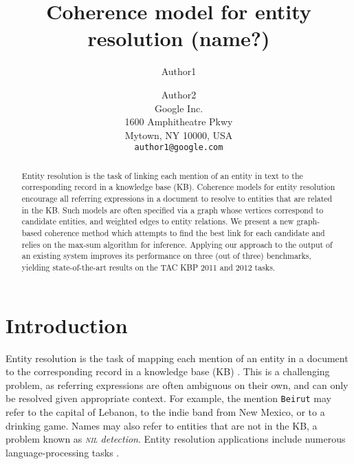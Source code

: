 \documentclass[11pt,letterpaper]{article}
\title{Coherence model for entity resolution (name?)}
\author{Author1 \and Author2\\
	    Google Inc. \\
	    1600 Amphitheatre Pkwy\\
	    Mytown, NY 10000, USA\\
	    {\tt author1@google.com}}
\date{}
\newcommand{\NIL}{\mbox{\textsc{nil}}}
\newcommand{\qtext}[1]{\texttt{#1}}
\begin{document}
\maketitle

\begin{abstract}
Entity resolution is the task of linking each mention of an entity in text to the corresponding record in a knowledge base (KB). Coherence models for entity resolution encourage all referring expressions in a document to resolve to entities that are related in the KB. 
Such models are often specified via a graph whose vertices correspond to candidate entities, and weighted edges to entity relations. We present a new graph-based coherence method which attempts to find the best link for each candidate and relies on the max-sum algorithm for inference.  Applying our approach to the output of an existing system improves its performance on three (out of three) benchmarks, yielding state-of-the-art results on the TAC KBP 2011 and 2012 tasks.
\end{abstract}


\section{Introduction}
%
Entity resolution is the task of mapping each mention of an entity in a document to the corresponding record in a knowledge base (KB) \cite{BunescuP06,Cucerzan07,Dredze2010,Hachey2013130}.  
This is a challenging problem, as referring expressions are often ambiguous on their own, and can only be resolved given appropriate context. For example, the mention \qtext{Beirut} may refer to the capital of Lebanon, to the indie band from New Mexico, or to a drinking game. Names may also refer to entities that are not in the KB, a problem known as \emph{{\NIL} detection}. 
Entity resolution applications include numerous language-processing tasks  \cite{Gabrilovich2007,Lin2012,finin2009Coreference,mayfield2009cross}. %
\end{document}

